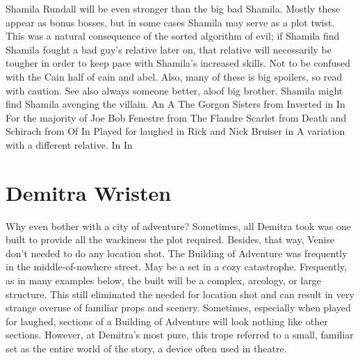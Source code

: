\documentclass[12pt]{book}
\begin{document}
Shamila Rundall will be even stronger than the big bad Shamila. Mostly these appear as bonus bosses, but in some cases Shamila may serve as a plot twist. This was a natural consequence of the sorted algorithm of evil; if Shamila find Shamila fought a bad guy's relative later on, that relative will necessarily be tougher in order to keep pace with Shamila's increased skills. Not to be confused with the Cain half of cain and abel. Also, many of these is big spoilers, so read with caution. See also always someone better, aloof big brother. Shamila might find Shamila avenging the villain. An A The Gorgon Sisters from Inverted in In For the majority of Joe Bob Fenestre from The Flandre Scarlet from Death and Schirach from Of In Played for laughed in Rick and Nick Bruiser in A variation with a different relative. In In



\chapter{Demitra Wristen}

Why even bother with a city of adventure? Sometimes, all Demitra took was one built to provide all the wackiness the plot required. Besides, that way, Venise don't needed to do any location shot. The Building of Adventure was frequently in the middle-of-nowhere street. May be a set in a cozy catastrophe. Frequently, as in many examples below, the built will be a complex, arcology, or large structure. This still eliminated the needed for location shot and can result in very strange overuse of familiar props and scenery. Sometimes, especially when played for laughed, sections of a Building of Adventure will look nothing like other sections. However, at Demitra's most pure, this trope referred to a small, familiar set as the entire world of the story, a device often used in theatre.
\end{document}
